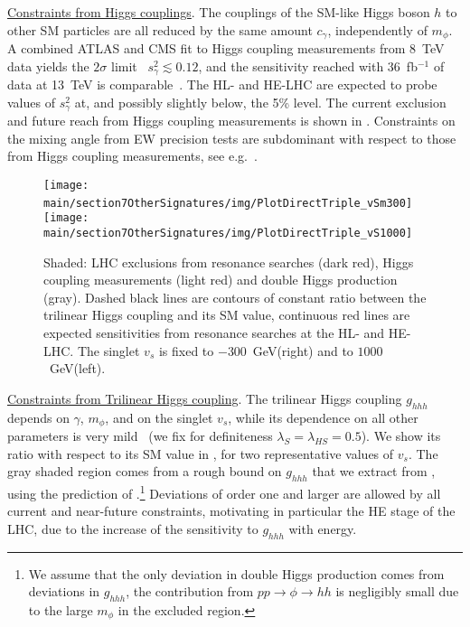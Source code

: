 \underline{Constraints from Higgs couplings}. The couplings of the SM-like Higgs boson $h$ to other SM particles are all reduced by the same amount $c_\gamma$, independently of $m_\phi$.
A combined ATLAS and CMS fit to Higgs coupling measurements from 8~TeV data yields the $2\sigma$ limit~\cite{Khachatryan:2016vau} $s_\gamma^2 \lesssim 0.12$, and the sensitivity reached with 36~fb$^{-1}$ of data at 13~TeV is comparable~\cite{CMS-PAS-HIG-17-031,ATLAS-CONF-2018-004}. The HL- and HE-LHC are expected to probe values of $s_\gamma^2$ at, and possibly slightly below, the 5\% level. The current exclusion and future reach from Higgs coupling measurements is shown in .
Constraints on the mixing angle from EW precision tests are subdominant with respect to those from Higgs coupling measurements, see e.g.~.
%
\begin{center}
\begin{figure}
\texttt{[image: \\main/section7OtherSignatures/img/PlotDirectTriple\_vSm300]}\,
\texttt{[image: \\main/section7OtherSignatures/img/PlotDirectTriple\_vS1000]}
\caption{\label{fig:ModelIndep} Shaded: LHC exclusions from resonance searches (dark red), Higgs coupling measurements (light red) and double Higgs production (gray). Dashed black lines are contours of constant ratio between the trilinear Higgs coupling and its SM value, continuous red lines are expected sensitivities from resonance searches at the HL- and HE-LHC. The singlet \vev $v_s$ is fixed to $-300$~GeV(right) and to $1000$~GeV(left).}
\end{figure}
\end{center}

\underline{Constraints from Trilinear Higgs coupling}. The trilinear Higgs coupling $g_{hhh}$ depends on $\gamma$, $m_\phi$, and on the singlet \vev $v_s$, while its dependence on all other parameters is very mild~\cite{Buttazzo:2015bka} (we fix for definiteness $\lambda_S = \lambda_{HS} = 0.5$).
We show its ratio with respect to its SM value in , for two representative values of $v_s$. The gray shaded region comes from a rough bound on $g_{hhh}$ that we extract from , using the prediction of .\footnote{We assume that the only deviation in double Higgs production comes from deviations in $g_{hhh}$, the contribution from $pp \to \phi \to hh$ is negligibly small due to the large $m_\phi$ in the excluded region.}
Deviations of order one and larger are allowed by all current and near-future constraints, motivating in particular the HE stage of the LHC, due to the increase of the sensitivity to $g_{hhh}$ with energy. 


